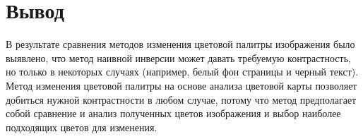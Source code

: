 \begin{table}[H]
	\caption{Результаты сравнения методов изменения цветовой палитры изображения}
	\centering
\end{table}

\section*{Вывод}

В результате сравнения методов изменения цветовой палитры изображения было выявлено, что метод наивной инверсии может давать требуемую контрастность, но только в некоторых случаях (например, белый фон страницы и черный текст). Метод изменения цветовой палитры на основе анализа цветовой карты позволяет добиться нужной контрастности в любом случае, потому что метод предполагает собой сравнение и анализ полученных цветов изображения и выбор наиболее подходящих цветов для изменения.
